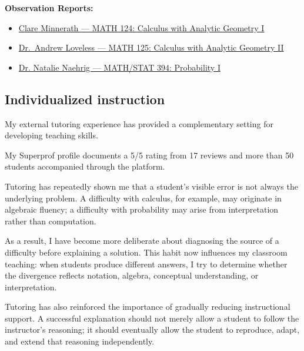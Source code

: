 \documentclass[11pt]{article}
\begin{document}
\noindent\textbf{Observation Reports:}
\begin{itemize}
    \item \hyperref[appendix:obs2]
    {Clare Minnerath --- MATH 124: Calculus with Analytic Geometry I}

    \item \hyperref[appendix:obs1]
    {Dr.\ Andrew Loveless --- MATH 125: Calculus with Analytic Geometry II}

    \item \hyperref[appendix:math394-observation]
    {Dr. Natalie Naehrig --- MATH/STAT 394: Probability I}
\end{itemize}


\subsection{Individualized instruction}

My external tutoring experience has provided a complementary
setting for developing teaching skills.

My Superprof profile documents a 5/5 rating from 17 reviews
and more than 50 students accompanied through the platform.

Tutoring has repeatedly shown me that a student's visible
error is not always the underlying problem.
A difficulty with calculus,
for example,
may originate in algebraic fluency;
a difficulty with probability may arise from interpretation
rather than computation.

As a result,
I have become more deliberate about diagnosing the source of a
difficulty before explaining a solution.
This habit now influences my classroom teaching:
when students produce different answers,
I try to determine whether the divergence reflects notation,
algebra,
conceptual understanding,
or interpretation.

Tutoring has also reinforced the importance of gradually
reducing instructional support.
A successful explanation should not merely allow a student to
follow the instructor's reasoning;
it should eventually allow the student to reproduce,
adapt,
and extend that reasoning independently.

\end{document}
